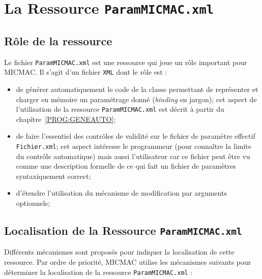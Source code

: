 
\section{La Ressource {\tt ParamMICMAC.xml}}

\subsection{R\^ole de la ressource}

Le fichier {\tt ParamMICMAC.xml} est une ressource qui joue un r\^ole 
important pour MICMAC. Il s'agit d'un fichier {\tt XML} dont le
r\^ole est :

\begin{itemize}
    \item  de g\'en\'erer automatiquement le code de la classe \CPP
           permettant de repr\'esenter et charger en m\'emoire 
           un param\'etrage donn\'e (\emph{binding} en jargon);
           cet aspect de l'utilisation de la ressource  {\tt ParamMICMAC.xml}
           est d\'ecrit \`a partir du chap\^itre~\ref{PROG:GENEAUTO};

    \item  de faire l'essentiel  des contr\^oles de validit\'e sur le
           fichier de param\`etre effectif {\tt Fichier.xml};
           cet aspect int\'eresse le programmeur (pour conna\^itre la limite
           du contr\^ole automatique) mais aussi l'utilisateur car ce
           fichier peut \^etre vu comme une description formelle de
           ce qui fait un fichier de param\`etres syntaxiquement correct;

     \item d'\'etendre l'utilisation du m\'ecanisme de modification par 
           arguments optionnels;
\end{itemize}


\subsection{Localisation de la Ressource {\tt ParamMICMAC.xml}}

\label{UTIL:SCPECIF:RES:LOC}

Diff\'erents m\'ecanismes sont propos\'es pour indiquer la
localisation de cette ressource. Par ordre de priorit\'e,
MICMAC utilise les m\'ecanismes suivants pour d\'eterminer
la localisation de la  ressource {\tt ParamMICMAC.xml} :


